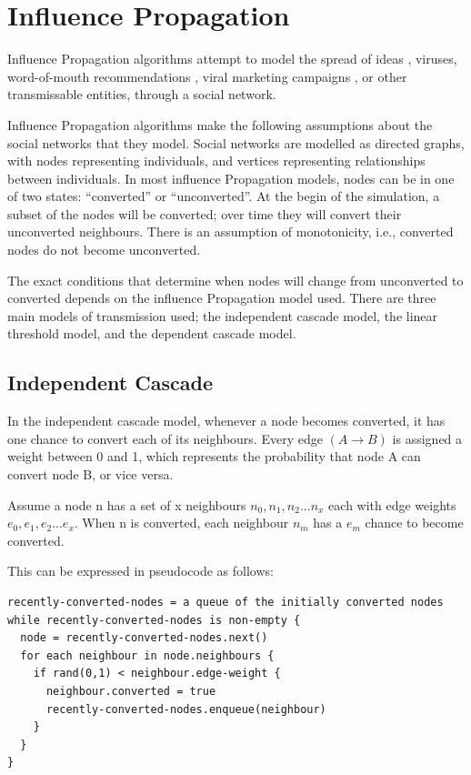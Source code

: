 \section{Influence Propagation}

 Influence Propagation algorithms attempt to model the spread of ideas \cite{rogers}, viruses, word-of-mouth recommendations \cite{goldlimul}, viral marketing campaigns \cite{kempe}, or other transmissable entities, through a social network.

Influence Propagation algorithms make the following assumptions about the social networks that they model. Social networks are modelled as directed graphs, with nodes representing individuals, and vertices representing relationships between individuals. In most influence Propagation models, nodes can be in one of two states: ``converted'' or ``unconverted''. At the begin of the simulation, a subset of the nodes will be converted; over time they will convert their unconverted neighbours. There is an assumption of monotonicity, i.e., converted nodes do not become unconverted.

 The exact conditions that determine when nodes will change from unconverted to converted depends on the influence Propagation model used. There are three main models of transmission used; the independent cascade model, the linear threshold model, and the dependent cascade model.

\subsection{Independent Cascade}
 In the independent cascade model, whenever a node becomes converted, it has one chance to convert each of its neighbours. Every edge \((A \rightarrow B)\) is assigned a weight between 0 and 1, which represents the probability that node A can convert node B, or vice versa.

Assume a node n has a set of x neighbours \(n_0,n_1,n_2...n_x\) each with edge weights \(e_0,e_1,e_2...e_x\). When n is converted, each neighbour \(n_m\) has a \(e_m\) chance to become converted.

This can be expressed in pseudocode as follows:

\begin{verbatim}
recently-converted-nodes = a queue of the initially converted nodes
while recently-converted-nodes is non-empty {
  node = recently-converted-nodes.next()
  for each neighbour in node.neighbours {
    if rand(0,1) < neighbour.edge-weight {
      neighbour.converted = true
      recently-converted-nodes.enqueue(neighbour)
    }
  }
}
\end{verbatim}

